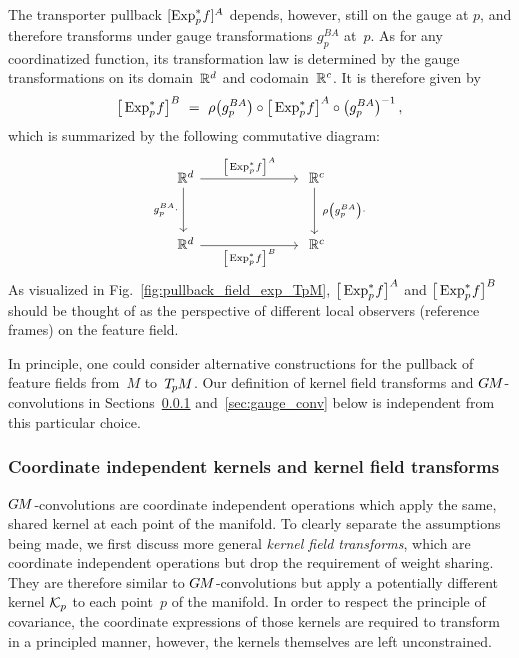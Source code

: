 The transporter pullback $[\operatorname{Exp}^*_p\mkern-2mu f]^A$ depends, however, still on the gauge at $p$, and therefore transforms under gauge transformations $g_p^{BA}$ at~$p$.
As for any coordinatized function, its transformation law is determined by the gauge transformations on its domain~$\mathbb{R}^d$ and codomain~$\mathbb{R}^c$.
It is therefore given by
\begin{align}\label{eq:trafo_law_transporter_pullback}
    \big[ \operatorname{Exp}^*_p\mkern-2mu f \big]^B\ =\ \rho\big( g_p^{BA} \big) \circ \big[ \operatorname{Exp}^*_p\mkern-2mu f \big]^A \circ \big(g_p^{BA} \big)^{-1} \,,
\end{align}
which is summarized by the following commutative diagram:
\begin{equation}\label{cd:}
\begin{tikzcd}[column sep=70pt, row sep=32pt, font=\normalsize]
    \R^d
        \arrow[d, "g_p^{BA} \cdot\,"']
        \arrow[r, "{\big[\mkern-1mu \Expspf \big]^A}"]
    &
    \R^c
        \arrow[d, "\ \rho\big(g_p^{BA}\big) \cdot"]
    \\
    \R^d
        \arrow[r, "{\big[\mkern-1mu \Expspf \big]^B}"']
    &
    \R^c
\end{tikzcd}
\end{equation}
As visualized in Fig.~\ref{fig:pullback_field_exp_TpM}, $\big[\operatorname{Exp}^*_p\mkern-2mu f\big]^A$ and $\big[\operatorname{Exp}^*_p\mkern-2mu f\big]^B$ should be thought of as the perspective of different local observers (reference frames) on the feature field.


In principle, one could consider alternative constructions for the pullback of feature fields from~$M$ to~$T_{\mkern-1.5mu p}\mkern-.5muM$.
Our definition of kernel field transforms and $G\mkern-1.4muM$-convolutions in Sections~\ref{sec:kernel_field_trafos} and~\ref{sec:gauge_conv} below is independent from this particular choice.








\subsubsection{Coordinate independent kernels and kernel field transforms}
\label{sec:kernel_field_trafos}

$G\mkern-1.4muM$-convolutions are coordinate independent operations which apply the same, shared kernel at each point of the manifold.
To clearly separate the assumptions being made, we first discuss more general \emph{kernel field transforms}, which are coordinate independent operations but drop the requirement of weight sharing.
They are therefore similar to $G\mkern-1.4muM$-convolutions but apply a potentially different kernel $\mathcal{K}_p$ to each point~$p$ of the manifold.
In order to respect the principle of covariance, the coordinate expressions of those kernels are required to transform in a principled manner, however, the kernels themselves are left unconstrained.


